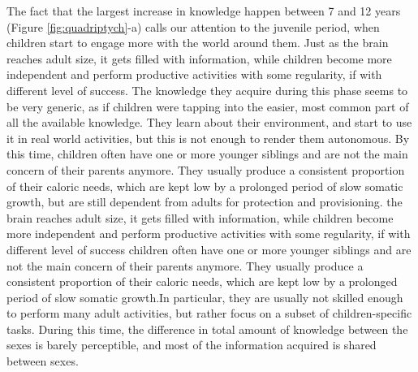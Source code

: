 




The fact that the largest increase in knowledge happen between 7 and 12 years (Figure \ref{fig:quadriptych}-a) calls our attention to the juvenile period, when children start to engage more with the world around them. Just as the brain reaches adult size, it gets filled with information, while children become more independent and perform productive activities with some regularity, if with different level of success. The knowledge they acquire during this phase seems to be very generic, as if children were tapping into the easier, most common part of all the available knowledge. They learn about their environment, and start to use it in real world activities, but this is not enough to render them autonomous. By this time, children often have one or more younger siblings and are not the main concern of their parents anymore. They usually produce a consistent proportion of their caloric needs, which are kept low by a prolonged period of slow somatic growth,  but are still dependent from adults for protection and provisioning. the brain reaches adult size, it gets filled with information, while children become more independent and perform productive activities with some regularity, if with different level of success children often have one or more younger siblings and are not the main concern of their parents anymore. They usually produce a consistent proportion of their caloric needs, which are kept low by a prolonged period of slow somatic growth.In particular, they are usually not skilled enough to perform many adult activities, but rather focus on a subset of children-specific tasks. 
During this time, the difference in total amount of knowledge between the sexes is barely perceptible, and most of the information acquired is shared between sexes.

